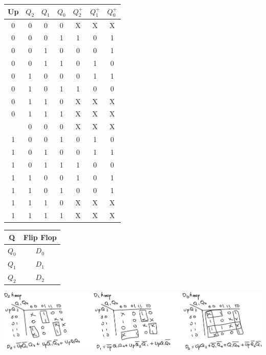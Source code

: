 \documentclass{article}
\begin{document}
    \begin{center}
        \begin{tabular} {c|ccc|ccc}
            Up & $Q_2$ & $Q_1$ & $Q_0$ & $Q_2^+$ & $Q_1^+$ & $Q_0^+$ \\
            \hline
            0 & 0 & 0 & 0 & X & X & X \\
            0 & 0 & 0 & 1 & 1 & 0 & 1 \\
            0 & 0 & 1 & 0 & 0 & 0 & 1 \\
            0 & 0 & 1 & 1 & 0 & 1 & 0 \\
            0 & 1 & 0 & 0 & 0 & 1 & 1 \\
            0 & 1 & 0 & 1 & 1 & 0 & 0 \\
            0 & 1 & 1 & 0 & X & X & X \\
            0 & 1 & 1 & 1 & X & X & X \\
            \hdashline
            1 & 0 & 0 & 0 & X & X & X \\
            1 & 0 & 0 & 1 & 0 & 1 & 0 \\
            1 & 0 & 1 & 0 & 0 & 1 & 1 \\
            1 & 0 & 1 & 1 & 1 & 0 & 0 \\
            1 & 1 & 0 & 0 & 1 & 0 & 1 \\
            1 & 1 & 0 & 1 & 0 & 0 & 1 \\
            1 & 1 & 1 & 0 & X & X & X \\
            1 & 1 & 1 & 1 & X & X & X \\
        \end{tabular}
    \end{center}

    \begin{center}
        \begin{tabular} {c|c}
            Q & Flip Flop \\
            \hline
            $Q_0$ & $D_0$ \\
            $Q_1$ & $D_1$ \\
            $Q_2$ & $D_2$ \\
        \end{tabular}
    \end{center}

    \begin{center}
        \includegraphics[width=\linewidth]{Q3_Kmaps.png}
    \end{center}
\end{document}
